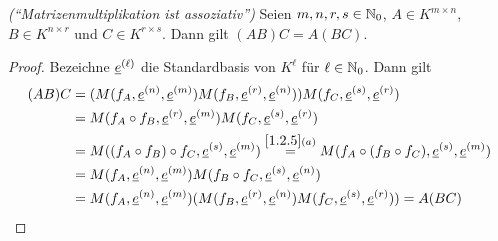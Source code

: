 \documentclass[../../main.tex]{subfiles}
\begin{document}
\begin{kor}\emph{("`Matrizenmultiplikation ist assoziativ"')}\label{7.2.6}
Seien $m,n,r,s\in\mathbb N_0$, $A\in K^{m\times n}$, $B\in K^{n\times r}$ und $C\in K^{r\times s}$.
Dann gilt $(AB)C=A(BC)$.
\end{kor}

\begin{proof}
Bezeichne ${\underline e}^{(\ell)}$ die Standardbasis von $K^\ell$ für $\ell\in\mathbb N_0$. Dann gilt
\begin{align*}
(AB)C&=(M(f_A,{\underline e}^{(n)},{\underline e}^{(m)})M(f_B,{\underline e}^{(r)},{\underline e}^{(n)}))M(f_C,{\underline e}^{(s)},{\underline e}^{(r)})\\
&=M(f_A\circ f_B,{\underline e}^{(r)},{\underline e}^{(m)})M(f_C,{\underline e}^{(s)},{\underline e}^{(r)})\\
&=M((f_A\circ f_B)\circ f_C,{\underline e}^{(s)},{\underline e}^{(m)})\overset{\ref{1.2.5}(a)}=M(f_A\circ(f_B\circ f_C),{\underline e}^{(s)},{\underline e}^{(m)})\\
&=M(f_A,{\underline e}^{(n)},{\underline e}^{(m)})M(f_B\circ f_C,{\underline e}^{(s)},{\underline e}^{(n)})\\
&=M(f_A,{\underline e}^{(n)},{\underline e}^{(m)})(M(f_B,{\underline e}^{(r)},{\underline e}^{(n)})M(f_C,{\underline e}^{(s)},{\underline e}^{(r)}))=A(BC)
\end{align*}
\end{proof}
\end{document}
